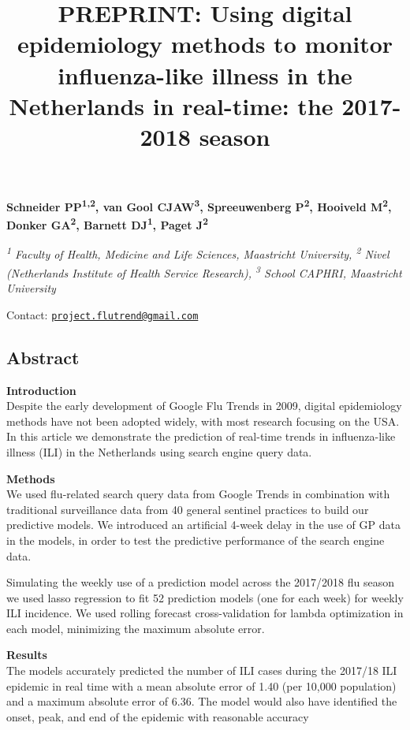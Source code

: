 \documentclass[]{article}
\title{PREPRINT: Using digital epidemiology methods to monitor influenza-like illness in
the Netherlands in real-time: the 2017-2018 season}
\author{}
\date{}
\begin{document}
\maketitle

\bigskip

\textbf{Schneider PP\textsuperscript{1,2}, van Gool
CJAW\textsuperscript{3}, Spreeuwenberg P\textsuperscript{2}, Hooiveld
M\textsuperscript{2}, Donker GA\textsuperscript{2}, Barnett
DJ\textsuperscript{1}, Paget J\textsuperscript{2}}

\begingroup\small

\emph{\textsuperscript{1} Faculty of Health, Medicine and Life Sciences,
Maastricht University, \textsuperscript{2} Nivel (Netherlands Institute
of Health Service Research), \textsuperscript{3} School CAPHRI,
Maastricht University}

Contact:
\href{mailto:project.flutrend@gmail.com}{\nolinkurl{project.flutrend@gmail.com}}
\endgroup

\bigskip

\hypertarget{abstract}{%
\subsection{\texorpdfstring{\textbf{Abstract}}{Abstract}}\label{abstract}}

\textbf{Introduction}\\
Despite the early development of Google Flu Trends in 2009, digital
epidemiology methods have not been adopted widely, with most research
focusing on the USA. In this article we demonstrate the prediction of
real-time trends in influenza-like illness (ILI) in the Netherlands
using search engine query data.

\textbf{Methods}\\
We used flu-related search query data from Google Trends in combination
with traditional surveillance data from 40 general sentinel practices to
build our predictive models. We introduced an artificial 4-week delay in
the use of GP data in the models, in order to test the predictive
performance of the search engine data.

Simulating the weekly use of a prediction model across the 2017/2018 flu
season we used lasso regression to fit 52 prediction models (one for
each week) for weekly ILI incidence. We used rolling forecast
cross-validation for lambda optimization in each model, minimizing the
maximum absolute error.

\textbf{Results}\\
The models accurately predicted the number of ILI cases during the
2017/18 ILI epidemic in real time with a mean absolute error of 1.40
(per 10,000 population) and a maximum absolute error of 6.36. The model
would also have identified the onset, peak, and end of the epidemic with
reasonable accuracy
\end{document}
